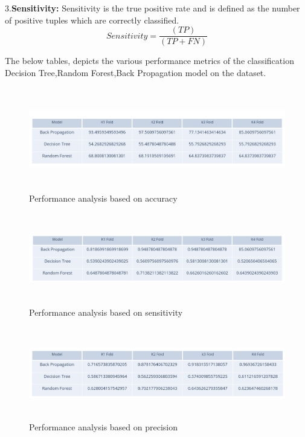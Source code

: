 3.\textbf{Sensitivity:} Sensitivity  is  the  true  positive  rate  and  is  defined  as  the number of positive tuples which are correctly classified.
 \[ Sensitivity=  \frac{(TP)}{(TP+FN)} \]
 
The  below  tables, depicts  the  various  performance metrics   of   the   classification   Decision Tree,Random Forest,Back Propagation model  on  the dataset.

 \begin{figure}[H]
\begin{center}
\includegraphics[width=160mm,height=45mm]{comparisonnew/analysisaccuracy.png}
 \caption{Performance analysis based on accuracy}
 \end{center}                
\end{figure}

 \begin{figure}[H]
\begin{center}
\includegraphics[width=160mm,height=40mm]{comparisonnew/analysissensitivity.png}
 \caption{Performance analysis based on sensitivity}
 \end{center}                
\end{figure}
 
 \begin{figure}[H]
\begin{center}
\includegraphics[width=160mm,height=40mm]{comparisonnew/analysisprecision.png}
 \caption{Performance analysis based on precision}
 \end{center}                
\end{figure}
 
